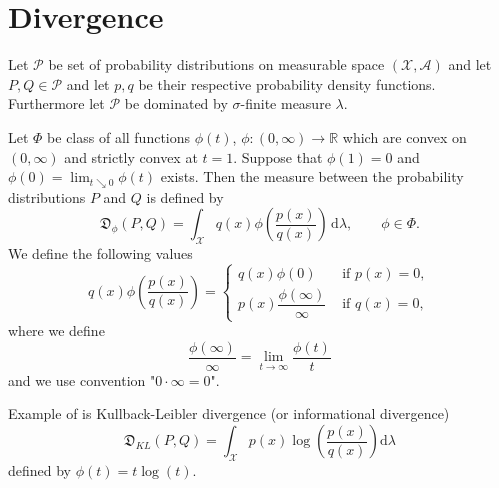 \chapter{\ren Divergence}
Let $\mathcal{P}$ be set of probability distributions on measurable space $(\mathcal{X, A})$ and let $P,Q \in \mathcal{P} $ and let $p,q$ be their respective probability density functions. Furthermore let $\mathcal{P}$ be dominated by $\sigma$-finite measure $\lambda$.

%
%


\begin{definition}
Let $\Phi$ be class of all functions  $\phi(t)$, $\phi : (0,\infty) \rightarrow \mathbb{R}$ which are convex on $(0,\infty)$ and strictly convex at $t = 1$. Suppose that $\phi(1) = 0$ and $\phi(0) = \lim_{t \searrow 0} \phi(t)$ exists. Then the {\em \phidiv} measure between the probability distributions $P$ and $Q$ is defined by 
\begin{equation}
\mathfrak{D}_\phi(P,Q) = \int_\mathcal{X} q(x) \phi \left( \frac{p(x)}{q(x)}\right) \,\mathrm{d}\lambda , \qquad \phi \in \Phi.
\label{eq:phiDiv}
\end{equation}
We define the following values
\begin{equation}
q(x) \phi\left( \frac{p(x)}{q(x)}\right) = 
\begin{cases}
q(x)\phi(0) & \text{ if } p(x) = 0,  \\
p(x) \dfrac{\phi(\infty)}{\infty} & \text{ if } q(x) = 0,
\end{cases}
\end{equation}
where we define
\[ \frac{\phi(\infty)}{\infty} = \lim_{t\rightarrow \infty} \frac{\phi(t)}{t}\]
and we use convention "$0\cdot\infty = 0$".


\label{def:phiDiv}
\end{definition}
\noindent Example of \phidiv is Kullback-Leibler divergence (or informational divergence) 
\begin{equation}
\mathfrak{D}_{KL}(P,Q) =  \int_\mathcal{X} p(x)\log\left( \frac{p(x)}{q(x)}\right) \mathrm{d}\lambda
\end{equation}
defined by $\phi(t) = t\log(t)$.


